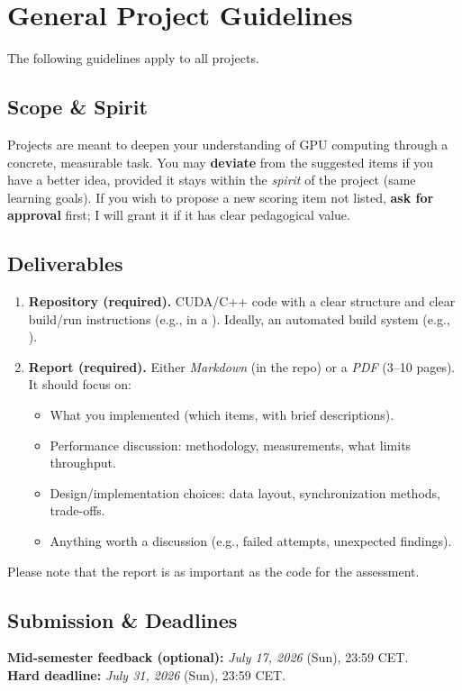\section*{General Project Guidelines}

\begin{tcolorbox}[colback=gray!6,colframe=gray!50!black]
The following guidelines apply to all projects.
\end{tcolorbox}

\subsection*{Scope \& Spirit}
Projects are meant to deepen your understanding of GPU computing through a concrete, measurable task.
You may \textbf{deviate} from the suggested items if you have a better idea, provided it stays within the \emph{spirit} of the project (same learning goals).
If you wish to propose a new scoring item not listed, \textbf{ask for approval} first; I will grant it if it has clear pedagogical value.

\subsection*{Deliverables}
\begin{enumerate}[label=\arabic*.]
    \item \textbf{Repository (required).} CUDA/C++ code with a clear structure and clear build/run instructions (e.g., in a ). Ideally, an automated build system (e.g., ).
    \item \textbf{Report (required).} Either \emph{Markdown} (in the repo) or a \emph{PDF} (3--10 pages). It should focus on:
    \begin{itemize}
        \item What you implemented (which items, with brief descriptions).
        \item Performance discussion: methodology, measurements, what limits throughput.
        \item Design/implementation choices: data layout, synchronization methods, trade-offs.
        \item Anything worth a discussion (e.g., failed attempts, unexpected findings).
    \end{itemize}
\end{enumerate}
Please note that the report is as important as the code for the assessment.

\subsection*{Submission \& Deadlines}
\begin{tcolorbox}[colback=white,colframe=black!10,title=Deadlines]
\textbf{Mid-semester feedback (optional):} \emph{July 17, 2026} (Sun), 23:59 CET.\\
\textbf{Hard deadline:} \emph{July 31, 2026} (Sun), 23:59 CET.
\end{tcolorbox}

